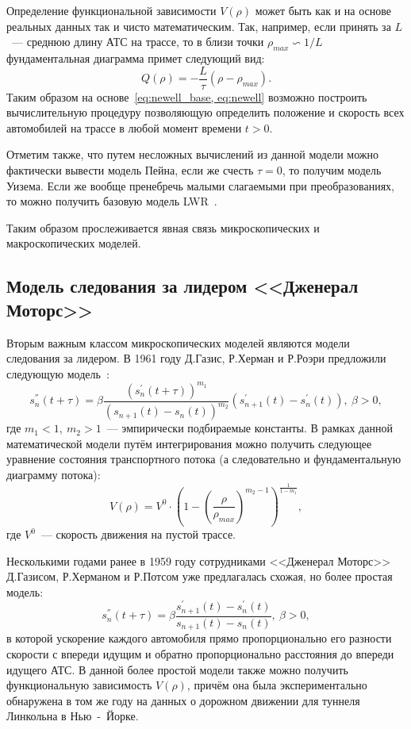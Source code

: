 Определение функциональной зависимости \(V(\rho)\) может быть как и на основе реальных данных так и чисто математическим.
Так, например, если принять за \(L\)~--- среднюю длину АТС на трассе, то в близи точки \(\rho_{max} \backsim 1/L \) фундаментальная диаграмма примет следующий вид:
\[
    Q(\rho) = -\frac{L}{\tau}(\rho - \rho_{max}).
\]
Таким образом на основе~\ref{eq:newell_base, eq:newell} возможно построить вычислительную процедуру позволяющую определить положение и скорость всех автомобилей на трассе в любой момент времени \(t>0\).

Отметим также, что путем несложных вычислений из данной модели можно фактически вывести модель Пейна, если же счесть \(\tau=0\), то получим модель Уизема.
Если же вообще пренебречь малыми слагаемыми при преобразованиях, то можно получить базовую модель LWR~\cite{gasn2017introd}.

Таким образом прослеживается явная связь микроскопических и макроскопических моделей.


\subsection{Модель следования за лидером <<Дженерал Моторс>>}\label{subsec:ch1/sec2/sub2}
Вторым важным классом микроскопических моделей являются модели следования за лидером.
В 1961 году Д.Газис, Р.Херман и Р.Роэри предложили следующую модель~\cite{gazis1974traffic}:
\[
    s_n^{''}(t+\tau) = \beta \frac{(s_n^{'}(t+\tau))^{m_1}}{(s_{n+1}(t) - s_n(t))^{m_2}}(s_{n+1}^{'}(t) - s_n^{'}(t)),\ \beta>0,
\]
где \(m_1<1,\ m_2>1\)~--- эмпирически подбираемые константы.
В рамках данной математической модели путём интегрирования можно получить следующее уравнение состояния транспортного потока (а следовательно и фундаментальную диаграмму потока):
\[
    V(\rho) = V^0\cdot\left(1 - \left(\frac{\rho}{\rho_{max}}\right)^{m_2 - 1} \right)^{\frac{1}{1-m_1}},
\]
где \(V^0\)~--- скорость движения на пустой трассе.

Несколькими годами ранее в 1959 году сотрудниками <<Дженерал Моторс>> Д.Газисом, Р.Херманом и Р.Потсом уже предлагалась схожая, но более простая модель:
\[
    s_n^{''}(t+\tau) = \beta \frac{s_{n+1}^{'}(t) - s_n^{'}(t)}{s_{n+1}(t) - s_n(t)},\ \beta>0,
\]
в которой ускорение каждого автомобиля прямо пропорционально его разности скорости с впереди идущим и обратно пропорционально расстояния до впереди идущего АТС.
В данной более простой модели также можно получить функциональную зависимость \(V(\rho)\), причём она была экспериментально обнаружена в том же году на данных о дорожном движении для туннеля Линкольна в Нью~-~Йорке.

